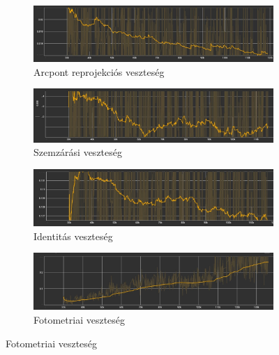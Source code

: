\documentclass[12pt,a4]{article}
\begin{document}
        \begin{figure}[h!]
            \centering
            \begin{subfigure}[b]{0.55\textwidth}
               \includegraphics[width=1\linewidth]{coarse-lmk-loss.jpg}
               \caption{Arcpont reprojekciós veszteség}
               \label{fig:coarse-lmk-loss} 
            \end{subfigure}

            \begin{subfigure}[b]{0.55\textwidth}
               \includegraphics[width=1\linewidth]{coarse-eye-loss.jpg}
               \caption{Szemzárási veszteség}
               \label{fig:coarse-eye-loss} 
            \end{subfigure}

            \begin{subfigure}[b]{0.55\textwidth}
               \includegraphics[width=1\linewidth]{coarse-identity-loss.jpg}
               \caption{Identitás veszteség}
               \label{fig:coarse-identity-loss} 
            \end{subfigure}

            \begin{subfigure}[b]{0.55\textwidth}
               \includegraphics[width=1\linewidth]{coarse-pho-loss.jpg}
               \caption{Fotometriai veszteség}
               \label{fig:coarse-pho-loss} 
            \end{subfigure}


\end{figure}
\end{document}
